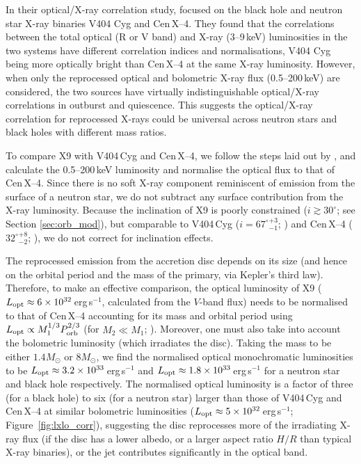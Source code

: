 \documentclass[a4paper,fleqn,usenatbib]{mnras}
\begin{document}
In their optical/X-ray correlation study, \citet{2016ApJ...826..149B} focused on the black hole and neutron star X-ray binaries V404 Cyg and Cen\,X--4. They found that the correlations between the total optical (R or V band) and X-ray (3--9\,keV) luminosities in the two systems have different correlation indices and normalisations, V404 Cyg being more optically bright than Cen\,X--4 at the same X-ray luminosity. However, when only the reprocessed optical and bolometric X-ray flux (0.5--200\,keV) are considered, the two sources have virtually indistinguishable optical/X-ray correlations in outburst and quiescence. This suggests the optical/X-ray correlation for reprocessed X-rays could be universal across neutron stars and black holes with different mass ratios. 

To compare X9 with V404\,Cyg and Cen\,X--4, we follow the steps laid out by \citet{2016ApJ...826..149B}, and calculate the 0.5--200\,keV luminosity and normalise the optical flux to that of Cen\,X--4. Since there is no soft X-ray component reminiscent of emission from the surface of a neutron star, we do not subtract any surface contribution from the X-ray luminosity. Because the inclination of X9 is poorly constrained ($i \gtrsim 30^\circ$; see Section \ref{sec:orb_mod}), but comparable to V404\,Cyg ($i = {67^\circ}^{+3}_{-1}$; \citealp{2010ApJ...716.1105K}) and Cen\,X--4 (${32^\circ}^{+8}_{-2}$; \citealp{2014MNRAS.440..504S}), we do not correct for inclination effects.

The reprocessed emission from the accretion disc depends on its size (and hence on the orbital period and the mass of the primary, via Kepler's third law). Therefore, to make an effective comparison, the optical luminosity of X9 ($L_{\rm opt} \approx 6 \times 10^{32}$\,erg\,s$^{-1}$, calculated from the $V$-band flux) needs to be normalised to that of Cen\,X--4 accounting for its mass and orbital period using $L_{\rm opt} \propto M_1^{1/3} P_{\rm orb}^{2/3}$ (for $M_2 \ll M_1$; \citealp{1994A&A...290..133V, 2016ApJ...826..149B}). Moreover, one must also take into account the bolometric luminosity (which irradiates the disc). Taking the mass to be either $1.4 M_{\odot}$ or $8 M_{\odot}$, we find the normalised optical monochromatic luminosities to be $L_{\rm opt} \approx 3.2 \times 10^{33}$\,erg\,s$^{-1}$ and $L_{\rm opt} \approx 1.8 \times10^{33}$\,erg\,s$^{-1}$ for a neutron star and black hole respectively. The normalised optical luminosity is a factor of three (for a black hole) to six (for a neutron star) larger than those of V404\,Cyg and Cen\,X--4 at similar bolometric luminosities ($L_{\rm opt} \approx 5 \times 10^{32}$\,erg\,s$^{-1}$; Figure~\ref{fig:lxlo_corr}), suggesting the disc reprocesses more of the irradiating X-ray flux (if the disc has a lower albedo, or a larger aspect ratio $H/R$ than typical X-ray binaries), or the jet contributes significantly in the optical band.
\end{document}
